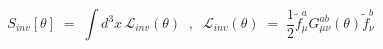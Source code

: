 \begin{equation}\label{eq:st}
S_{inv}[\theta] \;=\; \int d^3x \, {\mathcal L}_{inv}(\theta)\;\;,\;\;
{\mathcal L}_{inv}(\theta) \;=\; \frac{1}{2} {\tilde f}_\mu^a
G_{\mu\nu}^{ab}(\theta){\tilde f}_\nu^b
\end{equation}

